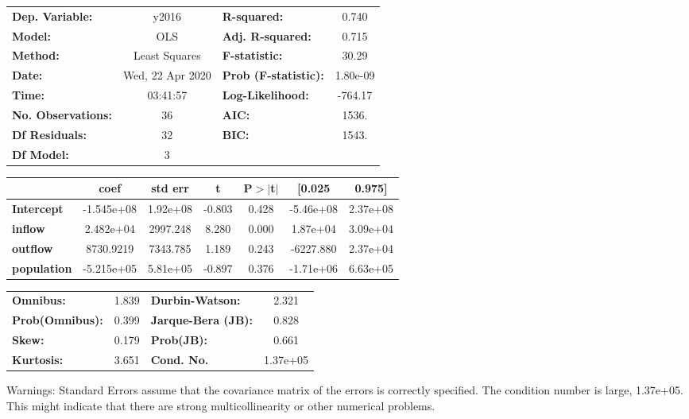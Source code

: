 \begin{center}
\begin{tabular}{lclc}
\toprule
\textbf{Dep. Variable:}    &      y2016       & \textbf{  R-squared:         } &     0.740   \\
\textbf{Model:}            &       OLS        & \textbf{  Adj. R-squared:    } &     0.715   \\
\textbf{Method:}           &  Least Squares   & \textbf{  F-statistic:       } &     30.29   \\
\textbf{Date:}             & Wed, 22 Apr 2020 & \textbf{  Prob (F-statistic):} &  1.80e-09   \\
\textbf{Time:}             &     03:41:57     & \textbf{  Log-Likelihood:    } &   -764.17   \\
\textbf{No. Observations:} &          36      & \textbf{  AIC:               } &     1536.   \\
\textbf{Df Residuals:}     &          32      & \textbf{  BIC:               } &     1543.   \\
\textbf{Df Model:}         &           3      & \textbf{                     } &             \\
\bottomrule
\end{tabular}
\begin{tabular}{lcccccc}
                    & \textbf{coef} & \textbf{std err} & \textbf{t} & \textbf{P$> |$t$|$} & \textbf{[0.025} & \textbf{0.975]}  \\
\midrule
\textbf{Intercept}  &   -1.545e+08  &     1.92e+08     &    -0.803  &         0.428        &    -5.46e+08    &     2.37e+08     \\
\textbf{inflow}     &    2.482e+04  &     2997.248     &     8.280  &         0.000        &     1.87e+04    &     3.09e+04     \\
\textbf{outflow}    &    8730.9219  &     7343.785     &     1.189  &         0.243        &    -6227.880    &     2.37e+04     \\
\textbf{population} &   -5.215e+05  &     5.81e+05     &    -0.897  &         0.376        &    -1.71e+06    &     6.63e+05     \\
\bottomrule
\end{tabular}
\begin{tabular}{lclc}
\textbf{Omnibus:}       &  1.839 & \textbf{  Durbin-Watson:     } &    2.321  \\
\textbf{Prob(Omnibus):} &  0.399 & \textbf{  Jarque-Bera (JB):  } &    0.828  \\
\textbf{Skew:}          &  0.179 & \textbf{  Prob(JB):          } &    0.661  \\
\textbf{Kurtosis:}      &  3.651 & \textbf{  Cond. No.          } & 1.37e+05  \\
\bottomrule
\end{tabular}
\end{center}

Warnings: \newline
 [1] Standard Errors assume that the covariance matrix of the errors is correctly specified. \newline
 [2] The condition number is large, 1.37e+05. This might indicate that there are \newline
 strong multicollinearity or other numerical problems.